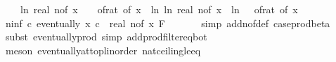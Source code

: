 \begin{isabellebody}
\ \ \ \ {\isacharparenleft}{\kern0pt}ln\ {\isacharparenleft}{\kern0pt}real\ {\isacharparenleft}{\kern0pt}n{\isacharunderscore}{\kern0pt}of\ x{\isacharparenright}{\kern0pt}{\isacharparenright}{\kern0pt}\ {\isacharplus}{\kern0pt}\ {}\ {\isacharslash}{\kern0pt}\ {\isacharparenleft}{\kern0pt}of{\isacharunderscore}{\kern0pt}rat\ {\isacharparenleft}{\kern0pt}{\isasymdelta}{\isacharunderscore}{\kern0pt}of\ x{\isacharparenright}{\kern0pt}{\isacharparenright}{\kern0pt}\ {\isacharasterisk}{\kern0pt}\ {\isacharparenleft}{\kern0pt}ln\ {\isacharparenleft}{\kern0pt}ln\ {\isacharparenleft}{\kern0pt}real\ {\isacharparenleft}{\kern0pt}n{\isacharunderscore}{\kern0pt}of\ x{\isacharparenright}{\kern0pt}{\isacharparenright}{\kern0pt}{\isacharparenright}{\kern0pt}\ {\isacharplus}{\kern0pt}\ ln\ {\isacharparenleft}{\kern0pt}{}\ {\isacharslash}{\kern0pt}\ of{\isacharunderscore}{\kern0pt}rat\ {\isacharparenleft}{\kern0pt}{\isasymdelta}{\isacharunderscore}{\kern0pt}of\ x{\isacharparenright}{\kern0pt}{\isacharparenright}{\kern0pt}{\isacharparenright}{\kern0pt}{\isacharparenright}{\kern0pt}{\isacharparenright}{\kern0pt}{\isachardoublequoteclose}\isanewline
\isanewline
\ \ \isamarkupfalse%
\ n{\isacharunderscore}{\kern0pt}inf{\isacharcolon}{\kern0pt}\ {\isachardoublequoteopen}{\isasymAnd}c{\isachardot}{\kern0pt}\ eventually\ {\isacharparenleft}{\kern0pt}{\isasymlambda}x{\isachardot}{\kern0pt}\ c\ {\isasymle}\ {\isacharparenleft}{\kern0pt}real\ {\isacharparenleft}{\kern0pt}n{\isacharunderscore}{\kern0pt}of\ x{\isacharparenright}{\kern0pt}{\isacharparenright}{\kern0pt}{\isacharparenright}{\kern0pt}\ {\isacharquery}{\kern0pt}F{\isachardoublequoteclose}\ \isanewline
\ \ \ \ \isamarkupfalse%
\ {\isacharparenleft}{\kern0pt}simp\ add{\isacharcolon}{\kern0pt}n{\isacharunderscore}{\kern0pt}of{\isacharunderscore}{\kern0pt}def\ case{\isacharunderscore}{\kern0pt}prod{\isacharunderscore}{\kern0pt}beta{\isacharprime}{\kern0pt}{\isacharparenright}{\kern0pt}\isanewline
\ \ \ \ \isamarkupfalse%
\ {\isacharparenleft}{\kern0pt}subst\ eventually{\isacharunderscore}{\kern0pt}prod{}{\isacharprime}{\kern0pt}{\isacharcomma}{\kern0pt}\ simp\ add{\isacharcolon}{\kern0pt}prod{\isacharunderscore}{\kern0pt}filter{\isacharunderscore}{\kern0pt}eq{\isacharunderscore}{\kern0pt}bot{\isacharparenright}{\kern0pt}\isanewline
\ \ \ \ \isamarkupfalse%
\ {\isacharparenleft}{\kern0pt}meson\ eventually{\isacharunderscore}{\kern0pt}at{\isacharunderscore}{\kern0pt}top{\isacharunderscore}{\kern0pt}linorder\ nat{\isacharunderscore}{\kern0pt}ceiling{\isacharunderscore}{\kern0pt}le{\isacharunderscore}{\kern0pt}eq{\isacharparenright}{\kern0pt}\isanewline

\end{isabellebody}
